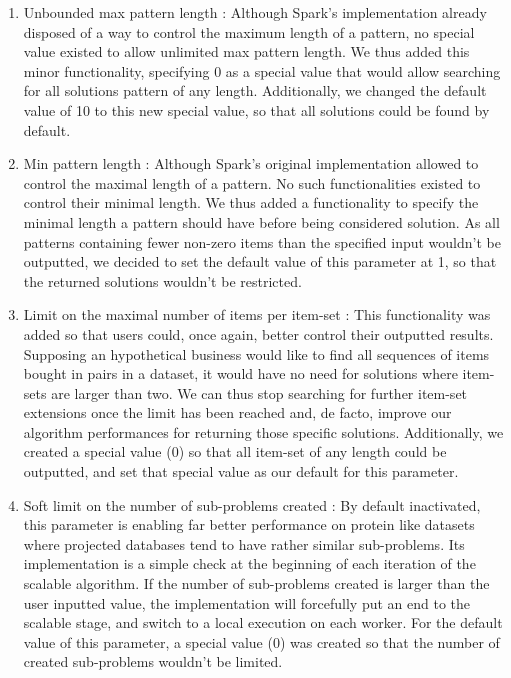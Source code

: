 \documentclass{eplmastersthesis}
\begin{document}
\begin{enumerate}
	\item Unbounded max pattern length : Although Spark's implementation already disposed of a way to control the maximum length of a pattern, no special value existed to allow unlimited max pattern length. We thus added this minor functionality, specifying 0 as a special value that would allow searching for all solutions pattern of any length. Additionally, we changed the default value of 10 to this new special value, so that all solutions could be found by default.
	\item Min pattern length : Although Spark's original implementation allowed to control the maximal length of a pattern. No such functionalities existed to control their minimal length. We thus added a functionality to specify the minimal length a pattern should have before being considered solution. As all patterns containing fewer non-zero items than the specified input wouldn't be outputted, we decided to set the default value of this parameter at 1, so that the returned solutions wouldn't be restricted.
	\item Limit on the maximal number of items per item-set : This functionality was added so that users could, once again, better control their outputted results. Supposing an hypothetical business would like to find all sequences of items bought in pairs in a dataset, it would have no need for solutions where item-sets are larger than two. We can thus stop searching for further item-set extensions once the limit has been reached and, de facto, improve our algorithm performances for returning those specific solutions. Additionally, we created a special value (0) so that all item-set of any length could be outputted, and set that special value as our default for this parameter.
	\item Soft limit on the number of sub-problems created : By default inactivated, this parameter is enabling far better performance on protein like datasets where projected databases tend to have rather similar sub-problems. Its implementation is a simple check at the beginning of each iteration of the scalable algorithm. If the number of sub-problems created is larger than the user inputted value, the implementation will forcefully put an end to the scalable stage, and switch to a local execution on each worker.
	For the default value of this parameter, a special value (0) was created so that the number of created sub-problems wouldn't be limited.\newline
	

\end{enumerate}
\end{document}
